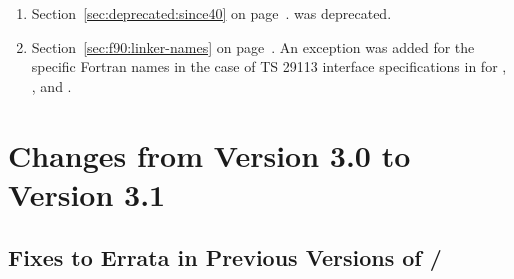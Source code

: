 \begin{enumerate}
\item
  Section~\ref{sec:deprecated:since40} on page~\pageref{sec:deprecated-fortran-sizeof}.
  \newline
   was deprecated.

\item
  Section~\ref{sec:f90:linker-names} on page~\pageref{sec:f90:linker-names}.
  \newline
  An exception was added for the specific Fortran names in the case of TS 29113 interface specifications 
  in  for , 
  , and .

\end{enumerate}

\section{Changes from Version 3.0 to Version 3.1}
\label{subsec:30to31}
% 
% 
% 
% 
%
% 
% 
% 
%

\subsection{Fixes to Errata in Previous Versions of \texorpdfstring{\MPI/}{MPI}} 
\label{sec:changes-30-31-errata}
 
